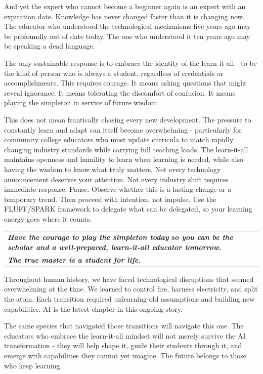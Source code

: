 \documentclass[
  letterpaper,
  DIV=11,
  numbers=noendperiod]{scrreprt}
\newcounter{none} %
\begin{document}
And yet the expert who cannot become a beginner again is an expert with
an expiration date. Knowledge has never changed faster than it is
changing now. The educator who understood the technological mechanisms
five years ago may be profoundly out of date today. The one who
understood it ten years ago may be speaking a dead language.

The only sustainable response is to embrace the identity of the
learn-it-all - to be the kind of person who is always a student,
regardless of credentials or accomplishments. This requires courage. It
means asking questions that might reveal ignorance. It means tolerating
the discomfort of confusion. It means playing the simpleton in service
of future wisdom.

This does not mean frantically chasing every new development. The
pressure to constantly learn and adapt can itself become overwhelming -
particularly for community college educators who must update curricula
to match rapidly changing industry standards while carrying full
teaching loads. The learn-it-all maintains openness and humility to
learn when learning is needed, while also having the wisdom to know what
truly matters. Not every technology announcement deserves your
attention. Not every industry shift requires immediate response. Pause.
Observe whether this is a lasting change or a temporary trend. Then
proceed with intention, not impulse. Use the FLUFF/SPARK framework to
delegate what can be delegated, so your learning energy goes where it
counts.

{\def\LTcaptype{none} %
\begin{longtable}[]{@{}
  >{\raggedright\arraybackslash}p{}@{}}
\toprule\noalign{}
\endhead
\bottomrule\noalign{}
\endlastfoot
\textbf{\emph{Have the courage to play the simpleton today}}
\textbf{\emph{so you can be the scholar and a well-prepared,
learn-it-all educator tomorrow.}} \\
\textbf{\emph{The true master is a student for life.}} \\
\end{longtable}
}

Throughout human history, we have faced technological disruptions that
seemed overwhelming at the time. We learned to control fire, harness
electricity, and split the atom. Each transition required unlearning old
assumptions and building new capabilities. AI is the latest chapter in
this ongoing story.

The same species that navigated those transitions will navigate this
one. The educators who embrace the learn-it-all mindset will not merely
survive the AI transformation - they will help shape it, guide their
students through it, and emerge with capabilities they cannot yet
imagine. The future belongs to those who keep learning.
\end{document}
